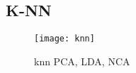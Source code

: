 
\subsection{K-NN}%
\label{sub:knn}
\begin{figure}[H]
    \centering
    \texttt{[image: knn]}
    \caption{knn PCA, LDA, NCA}%
    \label{fig:knn_pca_lda_nca}
\end{figure}
